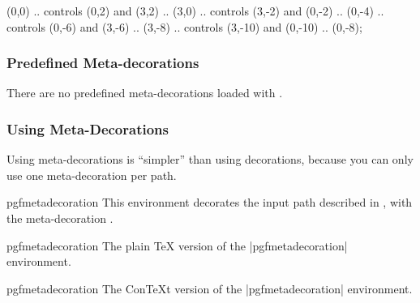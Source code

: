 \begin{command}{\pgfdeclaremetadecorate{}}
\begin{codeexample}[]

\tikz\draw[decorate,decoration={arrows,meta-segment length=2cm}]
  (0,0) .. controls (0,2)   and (3,2)   .. (3,0)
        .. controls (3,-2)  and (0,-2)  .. (0,-4)
        .. controls (0,-6)  and (3,-6)  .. (3,-8)
        .. controls (3,-10) and (0,-10) .. (0,-8);
\end{codeexample}

\end{command}


\subsubsection{Predefined Meta-decorations}

There are no predefined meta-decorations loaded with \pgfname{}.


\subsubsection{Using Meta-Decorations}

Using meta-decorations is ``simpler'' than using decorations, because
you can only use one meta-decoration per path.

\begin{environment}{{pgfmetadecoration}}
  This environment decorates the input path described in 
  , with the	meta-decoration .
\end{environment}

\begin{plainenvironment}{{pgfmetadecoration}}
  The plain \TeX{} version of the |{pgfmetadecoration}| environment.
\end{plainenvironment}

\begin{contextenvironment}{{pgfmetadecoration}}
  The Con\TeX t version of the |{pgfmetadecoration}| environment.
\end{contextenvironment}
